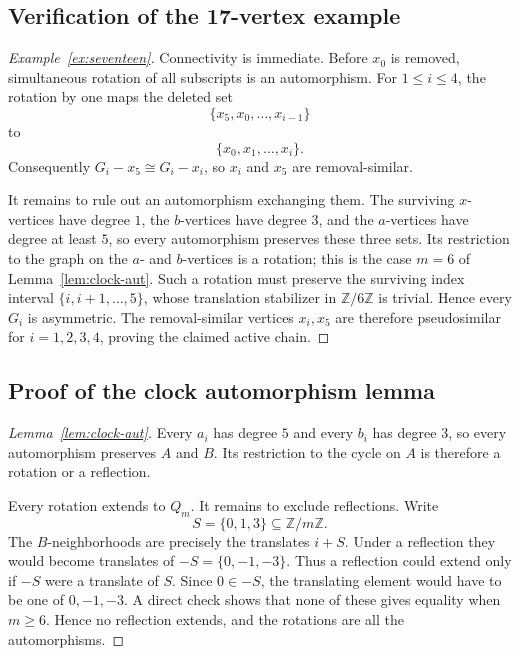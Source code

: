 \documentclass[11pt]{article}
\theoremstyle{definition}
\theoremstyle{remark}
\newcommand{\Z}{\mathbb{Z}}
\begin{document}
\subsection{Verification of the 17-vertex example}\label{app:example-seventeen}

\begin{proof}[Example~\ref{ex:seventeen}]
Connectivity is immediate.  Before $x_0$ is removed, simultaneous rotation of all subscripts is an automorphism.  For $1\le i\le4$, the rotation by one maps the deleted set
\[
    \{x_5,x_0,\ldots,x_{i-1}\}
\]
to
\[
    \{x_0,x_1,\ldots,x_i\}.
\]
Consequently $G_i-x_5\cong G_i-x_i$, so $x_i$ and $x_5$ are removal-similar.

It remains to rule out an automorphism exchanging them.  The surviving $x$-vertices have degree $1$, the $b$-vertices have degree $3$, and the $a$-vertices have degree at least $5$, so every automorphism preserves these three sets.  Its restriction to the graph on the $a$- and $b$-vertices is a rotation; this is the case $m=6$ of Lemma~\ref{lem:clock-aut}.  Such a rotation must preserve the surviving index interval $\{i,i+1,\ldots,5\}$, whose translation stabilizer in $\mathbb Z/6\mathbb Z$ is trivial.  Hence every $G_i$ is asymmetric.  The removal-similar vertices $x_i,x_5$ are therefore pseudosimilar for $i=1,2,3,4$, proving the claimed active chain.
\end{proof}

\subsection{Proof of the clock automorphism lemma}\label{app:clock-aut}

\begin{proof}[Lemma~\ref{lem:clock-aut}]
Every $a_i$ has degree $5$ and every $b_i$ has degree $3$, so every automorphism preserves $A$ and $B$. Its restriction to the cycle on $A$ is therefore a rotation or a reflection.

Every rotation extends to $Q_m$. It remains to exclude reflections. Write
\[
    S=\{0,1,3\}\subseteq \Z/m\Z.
\]
The $B$-neighborhoods are precisely the translates $i+S$. Under a reflection they would become translates of $-S=\{0,-1,-3\}$. Thus a reflection could extend only if $-S$ were a translate of $S$. Since $0\in -S$, the translating element would have to be one of $0,-1,-3$. A direct check shows that none of these gives equality when $m\ge6$. Hence no reflection extends, and the rotations are all the automorphisms.
\end{proof}
\end{document}

